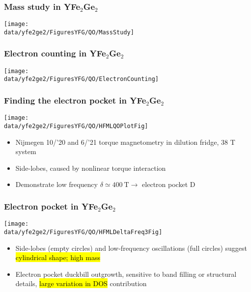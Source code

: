\begin{frame}[plain,label=YFGMass]
\frametitle{Mass study in YFe$_2$Ge$_2$}
\texttt{[image: \\data/yfe2ge2/FiguresYFG/QO/MassStudy]}
\end{frame}



\begin{frame}[plain,label=YFGCounting]
\frametitle{Electron counting in YFe$_2$Ge$_2$}
\texttt{[image: \\data/yfe2ge2/FiguresYFG/QO/ElectronCounting]}
\end{frame}


\begin{frame}[label=YFGEPocket]
\frametitle{Finding the electron pocket in YFe$_2$Ge$_2$}
\texttt{[image: \\data/yfe2ge2/FiguresYFG/QO/HFMLQOPlotFig]}

\begin{itemize}
\item
Nijmegen 10/'20 and 6/'21 torque magnetometry in dilution fridge, 38 T system
\item
Side-lobes, caused by nonlinear torque interaction
\item
Demonstrate low frequency $\delta \simeq \SI{400}{\tesla} \rightarrow$  electron pocket D
\end{itemize}
\end{frame}

\begin{frame}[plain,label=YFGEPocket2]
\frametitle{Electron pocket in YFe$_2$Ge$_2$}
\texttt{[image: \\data/yfe2ge2/FiguresYFG/QO/HFMLDeltaFreq3Fig]}
\begin{itemize}
\item
Side-lobes (empty circles) and low-frequency oscillations (full circles) suggest \hl{cylindrical shape; high mass} %
\item
Electron pocket duckbill outgrowth, sensitive to band filling or structural details, \hl{large variation in DOS} contribution
\end{itemize}

\end{frame}



